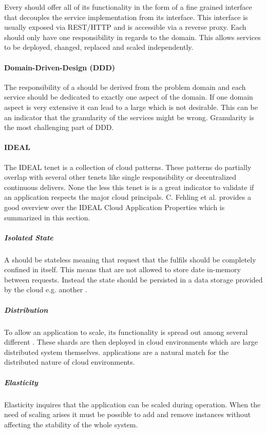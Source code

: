 Every \ms{} should offer all of its functionality in the form of a fine grained
interface that decouples the service implementation from its interface. This
interface is usually exposed via REST/HTTP and is accessible via a reverse
proxy. Each \ms{} should only have one responsibility in regards to the domain.
This allows services to be deployed, changed, replaced and scaled independently.

\paragraph{Domain-Driven-Design (DDD)}

The responsibility of a \ms{} should be derived from the problem domain and each
service should be dedicated to exactly one aspect of the domain. If one domain
aspect is very extensive it can lead to a large \ms{} which is not desirable.
This can be an indicator that the granularity of the services might be wrong.
Granularity is the most challenging part of DDD\cite{millett2015patterns}.

\paragraph{IDEAL}

The IDEAL tenet is a collection of cloud patterns. These patterns do partially
overlap with several other tenets like single responsibility or decentralized
continuous delivers. None the less this tenet is is a great indicator to
validate if an application respects the major cloud principals. C. Fehling et
al. provides a good overview over the  IDEAL Cloud Application Properties
which is summarized in this section\cite{fehling2015cloud}.

\subparagraph{Isolated State}
A \ms{} should be stateless meaning that request that the \ms{} fulfils should
be completely confined in itself. This means that \mss{} are not allowed to
store date in-memory between requests. Instead the state should be persisted in
a data storage provided by the cloud e.g. another \ms{}.

\subparagraph{Distribution}
To allow an application to scale, its functionality is spread out among several
different \mss{}. These shards are then deployed in cloud environments which are
large distributed system themselves. \ms{} applications are a natural match for
the distributed nature of cloud environments.

\subparagraph{Elasticity}
Elasticity inquires that the application can be scaled during operation. When
the need of scaling arises it must be possible to add and remove \ms{} instances
without affecting the stability of the whole system.

